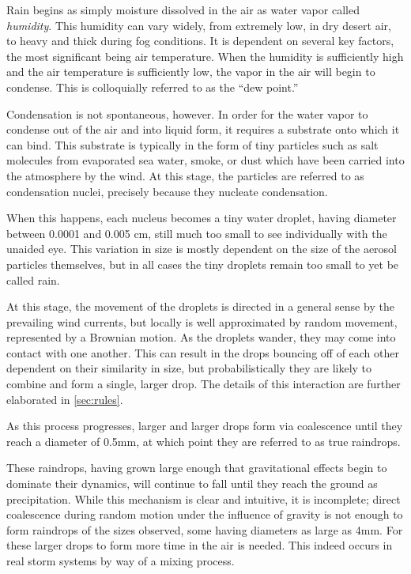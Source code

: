 \documentclass[twocolumn,a4paper,10pt]{article}
\begin{document}
Rain begins as simply moisture dissolved in the air as water vapor called
\emph{humidity}.  This humidity can vary widely, from extremely low, in dry
desert air, to heavy and thick during fog conditions. It is dependent on several
key factors, the most significant being air temperature\citet{coalesce}. When the
humidity is sufficiently high and the air temperature is sufficiently low, the
vapor in the air will begin to condense. This is colloquially referred to as the
``dew point.''

Condensation is not spontaneous, however. In order for the water vapor to
condense out of the air and into liquid form, it requires a substrate onto which
it can bind.  This substrate is typically in the form of tiny particles such as
salt molecules from evaporated sea water, smoke, or dust which have been carried
into the atmosphere by the wind. At this stage, the particles are referred to as
condensation nuclei, precisely because they nucleate condensation.

When this happens, each nucleus becomes a tiny water droplet, having diameter
between 0.0001 and 0.005 cm, still much too small to see individually with the
unaided eye. This variation in size is mostly dependent on the size of the
aerosol particles themselves, but in all cases the tiny droplets remain too
small to yet be called rain.

At this stage, the movement of the droplets is directed in a general sense by
the prevailing wind currents, but locally is well approximated by random
movement, represented by a Brownian motion. As the droplets wander, they may
come into contact with one another. This can result in the drops bouncing off of
each other dependent on their similarity in size, but probabilistically they
are likely to combine and form a single, larger drop. The details of this
interaction are further elaborated in \autoref{sec:rules}.

As this process progresses, larger and larger drops form via coalescence until
they reach a diameter of 0.5mm, at which point they are referred to as true
raindrops.

These raindrops, having grown large enough that gravitational effects begin to
dominate their dynamics, will continue to fall until they reach the ground as
precipitation. While this mechanism is clear and intuitive, it is incomplete;
direct coalescence during random motion under the influence of gravity is not
enough to form raindrops of the sizes observed, some having diameters as large
as 4mm. For these larger drops to form more time in the air is needed. This
indeed occurs in real storm systems by way of a mixing process.
\end{document}
